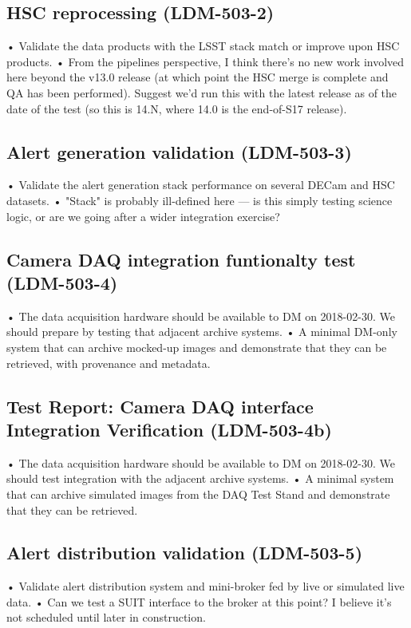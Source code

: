 \subsection{ HSC reprocessing \textbf{(LDM-503-2)}\label{LDM-503-2}}
• Validate the data products with the LSST stack match or improve upon HSC products.
 \newline• From the pipelines perspective, I think there's no new work involved here beyond the v13.0 release (at which point the HSC merge is complete and QA has been performed). Suggest we'd run this with the latest release as of the date of the test (so this is 14.N, where 14.0 is the end-of-S17 release).
\subsection{ Alert generation validation \textbf{(LDM-503-3)}\label{LDM-503-3}}
• Validate the alert generation stack performance on several DECam and HSC datasets.
 \newline• "Stack" is probably ill-defined here — is this simply testing science logic, or are we going after a wider integration exercise?
\subsection{ Camera DAQ integration funtionalty test \textbf{(LDM-503-4)}\label{LDM-503-4}}
• The data acquisition hardware should be available to DM on 2018-02-30. We should prepare by testing that adjacent archive systems.
 \newline• A minimal DM-only system that can archive mocked-up images and demonstrate that they can be retrieved, with provenance and metadata.
\subsection{Test Report: Camera DAQ interface Integration Verification \textbf{(LDM-503-4b)}\label{LDM-503-4b}}
• The data acquisition hardware should be available to DM on 2018-02-30. We should test integration with the adjacent archive systems.
 \newline• A minimal system that can archive simulated images from the DAQ Test Stand and demonstrate that they can be retrieved.
\subsection{ Alert distribution validation \textbf{(LDM-503-5)}\label{LDM-503-5}}
• Validate alert distribution system and mini-broker fed by live or simulated live data.
 \newline• Can we test a SUIT interface to the broker at this point? I believe it's not scheduled until later in construction.
